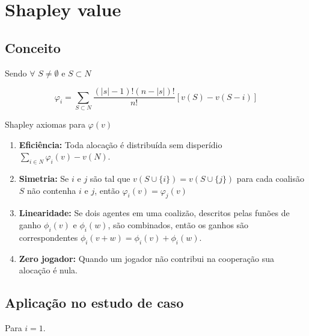 \documentclass[
	article,			        %
	11pt,				          %
	oneside,			        %
	a4paper,			        %
	english,			        %
	brazil,				        %
	sumario=tradicional
]{abntex2}\usepackage[]{graphicx}\usepackage[]{color}
\begin{document}
\section{Shapley value}

\subsection{Conceito}

Sendo $\forall$ $S \neq \emptyset$ e $S \subset N$

\begin{equation}
  \label{eq:shaVal}
  \varphi _{i} = \sum_{S \subset N} \frac{(|s| - 1)!(n - |s|)!}{n!}[v(S)-v(S - i)]
\end{equation}

Shapley axiomas para $\varphi(v)$
\begin{enumerate}
  \item \textbf{Eficiência:} Toda alocação é distribuída sem disperídio $\sum_{i \in N} \varphi_i(v) - v(N)$.
  \item \textbf{Simetria:} Se $i$ e $j$ são tal que $v(S \cup \{i\}) = v(S \cup \{j\})$ para cada coalisão $S$ não contenha $i$ e $j$, então $\varphi_i (v) = \varphi_j (v)$
  \item \textbf{Linearidade:} Se dois agentes em uma coalizão, descritos pelas funões de ganho $\phi_i(v)$ e $\phi_i(w)$, são combinados, então os ganhos são correspondentes $\phi_i(v + w) = \phi_i(v) + \phi_i(w)$.
  \item \textbf{Zero jogador:} Quando um jogador não contribui na cooperação sua alocação é nula.
\end{enumerate}

\subsection{Aplicação no estudo de caso}

Para $i = 1$.
\end{document}
